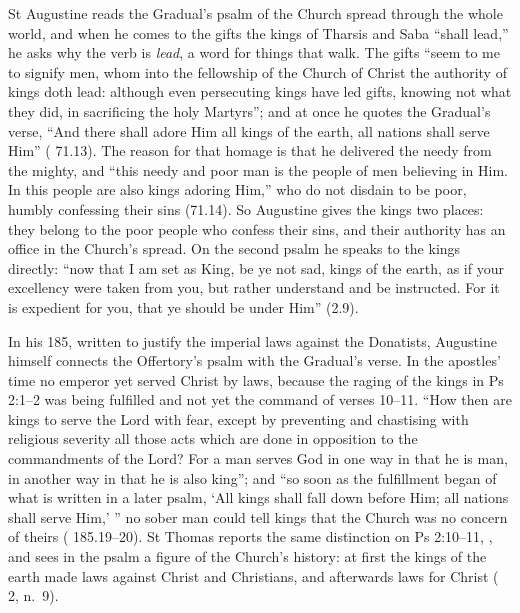 St Augustine reads the Gradual's psalm of the Church spread through the whole
world, and when he comes to the gifts the kings of Tharsis and Saba ``shall
lead,'' he asks why the verb is \emph{lead}, a word for things that walk. The
gifts ``seem to me to signify men, whom into the fellowship of the Church of
Christ the authority of kings doth lead: although even persecuting kings have
led gifts, knowing not what they did, in sacrificing the holy Martyrs''; and
at once he quotes the Gradual's verse, ``And there shall adore Him all kings of
the earth, all nations shall serve Him'' (
71.13). The reason for that homage is that he delivered the needy from the
mighty, and ``this needy and poor man is the people of men believing in Him.
In this people are also kings adoring Him,'' who do not disdain to be poor,
humbly confessing their sins (71.14). So Augustine gives the kings two
places: they belong to the poor people who confess their sins, and their
authority has an office in the Church's spread. On the second psalm he speaks
to the kings directly: ``now that I am set as King, be ye not sad, kings of the
earth, as if your excellency were taken from you, but rather understand and be
instructed. For it is expedient for you, that ye should be under Him''
(2.9).

In his  185, written to justify the imperial laws against the
Donatists, Augustine himself connects the Offertory's psalm with the
Gradual's verse. In the apostles' time no emperor yet served Christ by laws, because
the raging of the kings in Ps 2:1--2 was being fulfilled and not yet the
command of verses 10--11. ``How then are kings to serve the Lord with fear,
except by preventing and chastising with religious severity all those acts
which are done in opposition to the commandments of the Lord? For a man serves
God in one way in that he is man, in another way in that he is also king''; and
``so soon as the fulfillment began of what is written in a later psalm, `All
kings shall fall down before Him; all nations shall serve Him,' '' no sober man
could tell kings that the Church was no concern of theirs (
185.19--20). St Thomas reports the same distinction on Ps 2:10--11,
, and sees in the psalm a figure of the Church's history: at first the
kings of the earth made laws against Christ and Christians, and afterwards laws
for Christ ( 2, n.~9).

